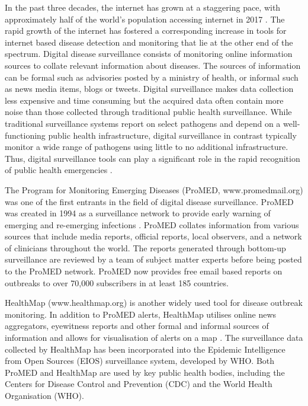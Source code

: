 \documentclass[9pt,twocolumn,twoside,lineno]{pnas-new}
\begin{document}
In the past three decades, the internet has grown at a staggering
pace, with approximately half of the world's population accessing
internet in 2017 \cite{internetgrowth}. 
The rapid growth of the internet has fostered a corresponding increase
in tools for internet based disease detection and monitoring 
that lie at the other end
of the spectrum. Digital disease surveillance consists of monitoring
online information sources to collate relevant information about
diseases. The sources of information can be formal such as advisories
posted by a ministry of health, or informal such as news media
items, blogs or tweets.
Digital surveillance makes data collection less expensive and time
consuming but the acquired data often contain more noise than those
collected through traditional public health surveillance. While traditional
surveillance systems report on select pathogens and depend on a
well-functioning public health infrastructure, digital surveillance
in contrast typically monitor a wide range of pathogens using little
to no additional infrastructure. Thus, digital surveillance tools
can play a significant role in the rapid recognition of public health
emergencies \cite{grein2000rumors, anema2014digital}.

The Program for Monitoring Emerging Diseases (ProMED,
www.promedmail.org) was one of the first entrants in the field of
digital disease surveillance. ProMED was created in 1994 as a surveillance
network to provide early warning of emerging and re-emerging
infections \cite{morse2012public}. ProMED collates information from
various sources that include media reports, official reports, local
observers, and a network of clinicians throughout the world. The reports
generated through bottom-up surveillance are reviewed by a team of
subject matter experts before being posted to the ProMED network. ProMED now
provides free email based reports on outbreaks to over 70,000
subscribers in at least 185 countries.

HealthMap (www.healthmap.org) is another widely used tool for disease
outbreak monitoring. In addition to ProMED alerts, HealthMap utilises
online news aggregators, eyewitness reports and other formal and
informal sources of information and allows for visualisation of alerts
on a map \cite{freifeld2008healthmap}. 
The surveillance data collected by HealthMap  has been incorporated into the Epidemic
Intelligence from Open Sources (EIOS) surveillance system, developed
by WHO. Both ProMED and HealthMap
are used by key public health bodies, including the Centers for Disease
Control and Prevention (CDC) and the World Health Organisation (WHO).
\end{document}
